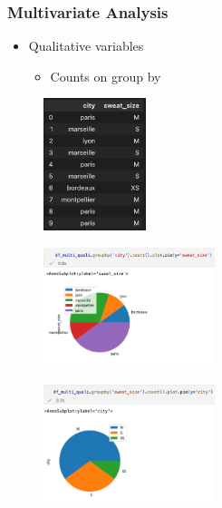 \begin{frame}\frametitle{Multivariate Analysis}
   \begin{minipage}{0.48\linewidth}
      \begin{itemize}
         \item Qualitative variables
         \begin{itemize}
            \item Counts on group by
         \end{itemize}
      \end{itemize}
      \vspace{.5cm}
      \begin{figure}[H]
         \includegraphics[width=3cm]{../images/illustrations/pattern_multivariate_qualitative_df.png}
      \end{figure}
   \end{minipage}
   \begin{minipage}{0.48\linewidth}
      \begin{figure}[H]
         \includegraphics[width=5cm]{../images/illustrations/pattern_multivariate_qualitative_pie_city.png}
      \end{figure}
      \begin{figure}[H]
         \includegraphics[width=5cm]{../images/illustrations/pattern_multivariate_qualitative_pie_sweat_sise.png}
      \end{figure}
   \end{minipage}
\end{frame}


